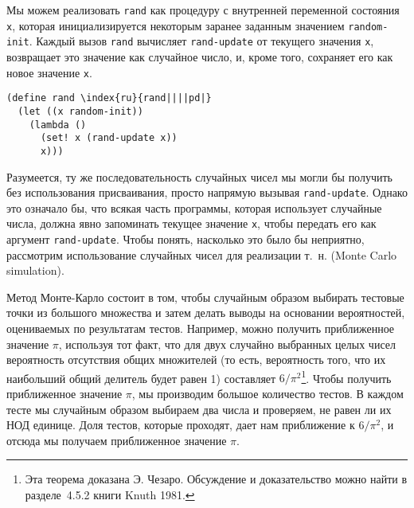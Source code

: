Мы можем реализовать {\tt rand} как процедуру с
внутренней переменной состояния {\tt x}, которая
инициализируется некоторым заранее заданным значением
{\tt random-init}.  Каждый вызов {\tt rand} вычисляет
{\tt rand-update} от текущего значения {\tt x},
возвращает это значение как случайное число, и, кроме того, сохраняет
его как новое значение {\tt x}.

\begin{Verbatim}[fontsize=\small]
(define rand \index{ru}{rand||||pd|}
  (let ((x random-init))
    (lambda ()
      (set! x (rand-update x))
      x)))
\end{Verbatim}

Разумеется, ту же последовательность случайных чисел мы
могли бы получить без использования присваивания, просто напрямую
вызывая {\tt rand-up\-date}.  Однако это означало бы, что всякая
часть программы, которая использует случайные числа, должна явно
запоминать текущее значение {\tt x}, чтобы передать его как
аргумент {\tt rand-update}.  
Чтобы понять, насколько это было бы
неприятно, рассмотрим использование случайных чисел для реализации
т.~н.
 (Monte Carlo simulation).

Метод Монте-Карло состоит в том, чтобы случайным образом
выбирать тестовые точки из большого множества и затем делать выводы на
основании вероятностей, оцениваемых по результатам тестов.  Например,
можно получить  приближенное значение $\pi$,
используя тот факт, что для двух случайно выбранных
целых чисел вероятность отсутствия общих множителей (то есть,
вероятность того, что их наибольший
общий делитель будет равен 1) составляет
$6/\pi^2$\footnote{Эта теорема доказана Э. Чезаро.  Обсуждение и
  доказательство можно найти в разделе~4.5.2 книги
  Knuth 1981.}.
Чтобы получить приближенное значение
$\pi$, мы производим большое количество тестов.
В каждом тесте мы случайным образом выбираем два числа и проверяем, не
равен ли их НОД единице.  Доля тестов, которые проходят, дает нам
приближение к $6/\pi^2$, и отсюда мы получаем
приближенное значение $\pi$.

